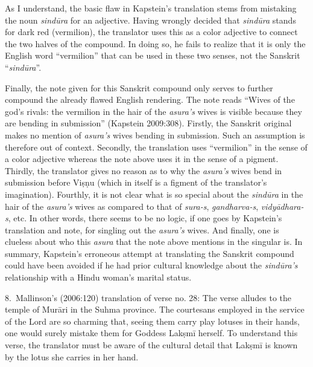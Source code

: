 As I understand, the basic flaw in Kapstein’s translation stems from mistaking the noun \textsl{sindūra} for an adjective. Having wrongly decided that \textsl{sindūra} stands for dark red (vermilion), the translator uses this as a color adjective to connect the two halves of the compound. In doing so, he fails to realize that it is only the English word “vermilion” that can be used in these two senses, not the Sanskrit “\textsl{sindūra}”.

Finally, the note given for this Sanskrit compound only serves to further compound the already flawed English rendering. The note reads “Wives of the god’s rivals: the vermilion in the hair of the \textsl{asura’s }wives is visible because they are bending in submission” (Kapstein 2009:308). Firstly, the Sanskrit original makes no mention of \textsl{asura’s} wives bending in submission. Such an assumption is therefore out of context. Secondly, the translation uses “vermilion” in the sense of a color adjective whereas the note above uses it in the sense of a pigment. Thirdly, the translator gives no reason as to why the \textsl{asura’s} wives bend in submission before Viṣṇu (which in itself is a figment of the translator’s imagination). Fourthly, it is not clear what is so special about the \textsl{sindūra} in the hair of the \textsl{asura’s} wives as compared to that of \textsl{sura-s}, \textsl{gandharva-s}, \textsl{vidyādhara-s}, etc. In other words, there seems to be no logic, if one goes by Kapstein’s translation and note, for singling out the \textsl{asura’s} wives. And finally, one is clueless about who this \textsl{asura} that the note above mentions in the singular is. In summary, Kapstein’s erroneous attempt at translating the Sanskrit compound could have been avoided if he had prior cultural knowledge about the \textsl{sindūra’s} relationship with a Hindu woman’s marital status.

8.~Mallinson’s (2006:120) translation of verse no. 28: The verse alludes to the temple of Murāri in the Suhma province. The courtesans employed in the service of the Lord are so charming that, seeing them carry play lotuses in their hands, one would surely mistake them for Goddess Lakṣmī herself. To understand this verse, the translator must be aware of the cultural detail that Lakṣmī is known by the lotus she carries in her hand. 

